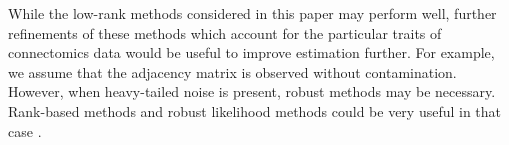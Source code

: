 \documentclass[journal,twoside,web]{ieeecolor}
\begin{document}




While the low-rank methods considered in this paper may perform well, further refinements of these methods which account for the particular traits of connectomics data would be useful to improve estimation further.
For example, we assume that the adjacency matrix is observed without contamination.
However, when heavy-tailed noise is present, robust methods may be necessary.
Rank-based methods and robust likelihood methods could be very useful in that case \cite{huber2009robust,qin2013maximum}.

\end{document}
